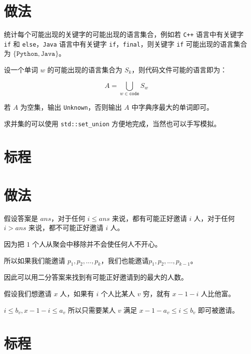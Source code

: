 \documentclass{../cpct/ctsol}
\begin{document}

\makesolution
\section*{做法}

统计每个可能出现的关键字的可能出现的语言集合，例如若 \texttt{C++} 语言中有关键字 \texttt{if} 和 \texttt{else}，\texttt{Java} 语言中有关键字 \texttt{if}，\texttt{final}，则关键字 \texttt{if} 可能出现的语言集合为 $\{\texttt{Python}, \texttt{Java}\}$。

设一个单词 $w$ 的可能出现的语言集合为 $S_k$，则代码文件可能的语言即为：

$$A = \bigcup\limits_{w \in \texttt{code}} S_w$$

若 $A$ 为空集，输出 \texttt{Unknown}，否则输出 $A$ 中字典序最大的单词即可。

求并集的可以使用 \lstinline{std::set_union} 方便地完成，当然也可以手写模拟。

\section*{标程}


\makesolution
\section*{做法}

假设答案是 $ans$，对于任何 $i \leq ans$ 来说，都有可能正好邀请 $i$ 人，对于任何 $i > ans$ 来说，都不可能正好邀请 $i$ 人。

因为把 $1$ 个人从聚会中移除并不会使任何人不开心。

所以如果我们能邀请 $p_1,p_2,\dots,p_k$，我们也能邀请$p_1,p_2,\dots,p_{k-1}$。

因此可以用二分答案来找到有可能正好邀请到的最大的人数。

假设我们想邀请 $x$ 人，如果有 $i$ 个人比某人 $v$ 穷，就有 $x-1-i$ 人比他富。

$i \leq b_v,x-1-i \leq a_v$ 所以只需要某人 $v$ 满足 $x-1-a_v \leq i \leq b_v$ 即可被邀请。

\section*{标程}

\end{document}
